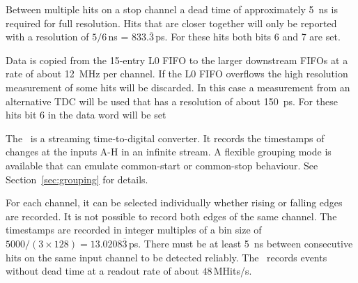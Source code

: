 {    Between multiple hits on a stop channel a dead time of approximately
    \SI{5}{\nano\second} is required for full resolution.  Hits that are
    closer together will only be reported with a resolution of
    $5/6$\,\si{\nano\second} = $833.\overline{3}$\,\si{\pico\second}. For these
    hits both bits 6 and 7 are set.

    Data is copied from the 15-entry L0 FIFO to the larger downstream FIFOs at
    a rate of about \SI{12}{\mega\hertz} per channel.  If the L0 FIFO
    overflows the high resolution measurement of some hits will be discarded. 
    In this case a measurement from an alternative TDC will be used that has a
    resolution of about \SI{150}{\pico\second}.  For these hits bit 6 in the
    data word will be set
} { %
    The \deviceName\ is a streaming time-to-digital converter. It records the
    timestamps of changes at the inputs A-H in an infinite stream.  A flexible
    grouping mode is available that can emulate common-start or common-stop
    behaviour. See Section~\ref{sec:grouping} for details.

    For each channel, it can be selected individually whether rising or
    falling edges are recorded. It is not possible to record both edges of the
    same channel.  The timestamps are recorded in integer multiples of a bin
    size of $5000/(3\times 128) = 13.0208\overline{3}$\,\si{\pico\second}. 
    There must be at least \SI{5}{\nano\second} between consecutive hits on
    the same input channel to be detected reliably.  The \deviceName\ records
    events without dead time at a readout rate of about $48$\,MHits/s.
}